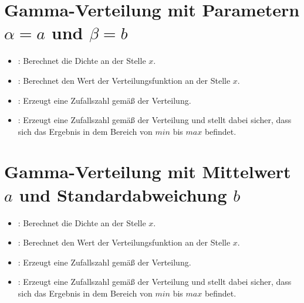 \section{Gamma-Verteilung mit Parametern \texorpdfstring{$\alpha=a$}{a} und \texorpdfstring{$\beta=b$}{b}}

\begin{itemize}

\item
{}:
Berechnet die Dichte an der Stelle $x$.

\item
{}:
Berechnet den Wert der Verteilungsfunktion an der Stelle $x$.

\item
{}:
Erzeugt eine Zufallszahl gemäß der Verteilung.

\item
{}:
Erzeugt eine Zufallszahl gemäß der Verteilung und stellt dabei sicher, dass sich das Ergebnis in dem Bereich von $min$ bis $max$ befindet.

\end{itemize}



\section{Gamma-Verteilung mit Mittelwert \texorpdfstring{$a$}{a} und Standardabweichung \texorpdfstring{$b$}{b}}

\begin{itemize}

\item
{}:
Berechnet die Dichte an der Stelle $x$.

\item
{}:
Berechnet den Wert der Verteilungsfunktion an der Stelle $x$.

\item
{}:
Erzeugt eine Zufallszahl gemäß der Verteilung.

\item
{}:
Erzeugt eine Zufallszahl gemäß der Verteilung und stellt dabei sicher, dass sich das Ergebnis in dem Bereich von $min$ bis $max$ befindet.

\end{itemize}



